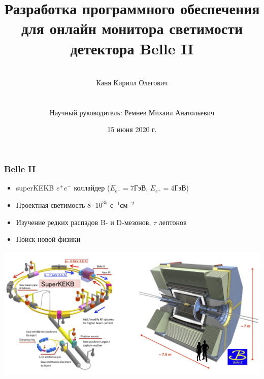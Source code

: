 \documentclass{beamer}
\title{Разработка программного обеспечения для онлайн монитора светимости детектора Belle II}
\author{\\Каня Кирилл Олегович \\~\\~\\
    Научный руководитель: Ремнев Михаил Анатольевич}
\institute{Новосибирский Государственный Университет}
\date[15 июня 2020 г.]{15 июня 2020 г.}
\begin{document}
\begin{frame}
\titlepage
\end{frame}

\begin{frame}
\frametitle{Belle II}
  \begin{itemize}
    \item superKEKB $e^+e^-$ коллайдер ($E_{e^-}=7$ГэВ, $E_{e^+}=4$ГэВ)
    \item Проектная светимость $8\cdot10^{35}$ с$^{-1}$см$^{-2}$
    \item Изучение редких распадов B- и D-мезонов, $\tau$ лептонов
    \item Поиск новой физики
  \end{itemize}
  \includegraphics[width=\textwidth]{SuperKEKB_BelleII.jpg}
\end{frame}
\end{document}
